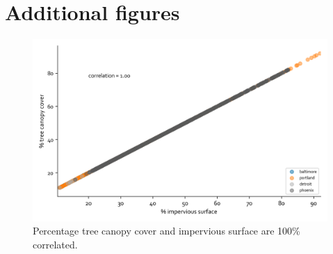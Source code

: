 \documentclass[review]{elsarticle}
\begin{document}
\section{Additional figures}
\begin{figure}[h]
    \centering
    \includegraphics[width=\linewidth]{fig/report/imp_v_tree_500.png}
    \caption{
    Percentage tree canopy cover and impervious surface are 100\% correlated.
    }
    \label{fig:imp_tree}
\end{figure}
\end{document}
